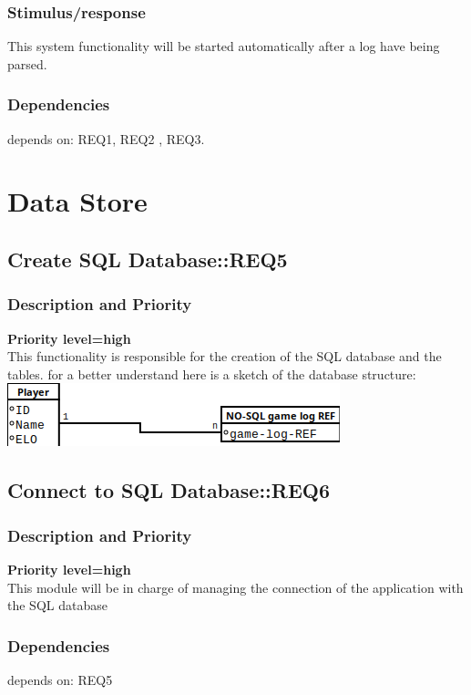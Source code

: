 \documentclass{scrreprt}
\begin{document}
\subsubsection{Stimulus/response}
This system functionality will be started automatically after a log have being parsed.
\subsubsection{Dependencies}
depends on: REQ1, REQ2 , REQ3.

\newpage
\section{Data Store}

\subsection{Create SQL Database::REQ5}

\subsubsection{Description and Priority}
\textbf{Priority level=high}\\
This functionality is responsible for the creation of the SQL database and the
tables.
for a better understand here is a  sketch of the database structure:\\

\includegraphics[keepaspectratio]{SQL}


\subsection{Connect to SQL Database::REQ6}
\subsubsection{Description and Priority}
\textbf{Priority level=high}\\
This module will be in charge of managing the connection of the application with
the SQL database
\subsubsection{Dependencies}
depends on: REQ5
\end{document}
